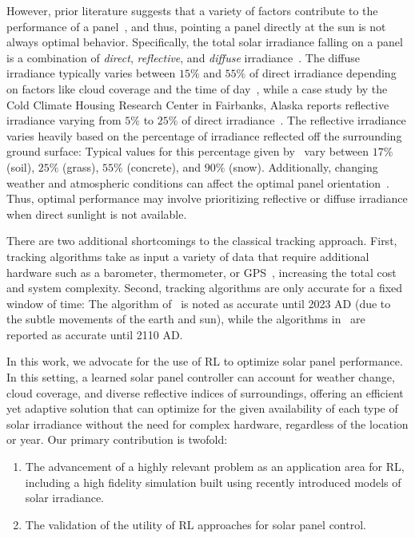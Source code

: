 \documentclass{article}
\begin{document}
However, prior literature suggests that a variety of factors contribute to the performance of a panel~\cite{King2001}, and thus, pointing a panel directly at the sun is not always optimal behavior. Specifically, the total solar irradiance falling on a panel is a combination of {\it direct}, {\it reflective}, and {\it diffuse} irradiance~\cite{Benghanem2011}. The diffuse irradiance typically varies between $15\%$ and $55\%$ of direct irradiance depending on factors like cloud coverage and the time of day~\cite{peterson1981ratio}, while a case study by the Cold Climate Housing Research Center in Fairbanks, Alaska reports reflective irradiance varying from $5\%$ to $25\%$ of direct irradiance~\cite{colgan2010}. The reflective irradiance varies heavily based on the percentage of irradiance reflected off the surrounding ground surface: Typical values for this percentage given by~\citet{mcevoy2003practical} vary between $17\%$ (soil), $25\%$ (grass), $55\%$ (concrete), and $90\%$ (snow). Additionally, changing weather and atmospheric conditions can affect the optimal panel orientation~\cite{Kelly2009}. Thus, optimal performance may involve prioritizing reflective or diffuse irradiance when direct sunlight is not available.

There are two additional shortcomings to the classical tracking approach. First, tracking algorithms take as input a variety of data that require additional hardware such as a barometer, thermometer, or GPS~\cite{Grena2012}, increasing the total cost and system complexity. Second, tracking algorithms are only accurate for a fixed window of time: The algorithm of~\citet{Grena2008} is noted as accurate until 2023 AD (due to the subtle movements of the earth and sun), while the algorithms in~\citet{Grena2012} are reported as accurate until 2110 AD.

In this work, we advocate for the use of RL to optimize solar panel performance. In this setting, a learned solar panel controller can account for weather change, cloud coverage, and diverse reflective indices of surroundings, offering an efficient yet adaptive solution that can optimize for the given availability of each type of solar irradiance without the need for complex hardware, regardless of the location or year. Our primary contribution is twofold:
\begin{enumerate}
\item The advancement of a highly relevant problem as an application area for RL, including a high fidelity simulation built using recently introduced models of solar irradiance.
\item The validation of the utility of RL approaches for solar panel control.
\end{enumerate}
\end{document}
